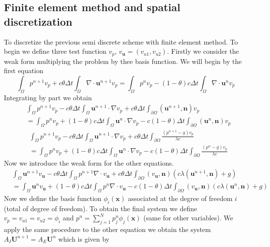 \documentclass[a4paper,twoside,french,english,11pt]{article}
\begin{document}
\subsection{Finite element method and spatial discretization}
To discretize the previous semi discrete scheme with finite element method. To begin we define three test function $v_p$, $v_{\bm{u}}=(v_{u1},v_{u2})$. Firstly we consider the weak form multiplying the problem by thee basis function. We will begin by the first equation
$$
\int_{\Omega}p^{n+1}v_p+ c\theta\Delta t  \int_{\Omega}\nabla \cdot \mathbf{u}^{n+1}v_p=  \int_{\Omega}p^n v_p- (1-\theta) c\Delta t  \int_{\Omega}\nabla \cdot \mathbf{u}^{n} v_p
$$
Integrating by part we obtain
\begin{align*}
&\int_{\Omega}p^{n+1}v_p -c\theta \Delta t  \int_{\Omega} \mathbf{u}^{n+1}\cdot \nabla v_p+ c\theta\Delta t  \int_{\partial \Omega} (\mathbf{u}^{n+1},\bm{n}) v_p\\
& =  \int_{\Omega}p^n v_p +(1-\theta) c\Delta t  \int_{\Omega}\mathbf{u}^{n} \cdot \nabla v_p -c (1-\theta)\Delta t  \int_{\partial \Omega} (\mathbf{u}^n,\bm{n}) v_p
\end{align*}
\begin{align*}
&\int_{\Omega}p^{n+1}v_p -c\theta\Delta t  \int_{\Omega} \mathbf{u}^{n+1}\cdot \nabla v_p+ c\theta\Delta t  \int_{\partial \Omega} \frac{(p^{n+1}-g) v_p}{\lambda c}\\
& =  \int_{\Omega}p^n v_p +(1-\theta) c\Delta t  \int_{\Omega}\mathbf{u}^{n} \cdot \nabla v_p -c (1-\theta)\Delta t  \int_{\partial \Omega} \frac{(p^n-g) v_p}{\lambda c}
\end{align*}
Now we introduce the weak form for the other equations.
\begin{align*}
&\int_{\Omega}\bm{u}^{n+1}v_{\bm{u}} -c\theta \Delta t \int_{\Omega} p^{n+1}\nabla \cdot v_{\bm{u}}+ c\theta\Delta t  \int_{\partial \Omega} (v_{\bm{u}},\bm{n}) (c\lambda(\bm{u}^{n+1},\bm{n}) +g)\\
& =  \int_{\Omega}\bm{u}^{n} v_{\bm{u}} +(1-\theta) c\Delta t  \int_{\Omega} p^n\nabla \cdot v_{\bm{u}} -c (1-\theta)\Delta t  \int_{\partial \Omega} (v_{\bm{u}},\bm{n}) (c\lambda(\bm{u}^{n},\bm{n}) +g)
\end{align*}
Now we define the basis function $\phi_i(\mathbf{x})$ associated at the degree of freedom $i$ (total of degree of freedom). To obtain the final system we define $v_p=v_{u1}=v_{u2}=\phi_i$ and $p^n=\sum_{j=1}^N p_j^n \phi_j(\mathbf{x})$ (same for other variables).
We apply the same procedure to the other equation we obtain the system $A_I \mathbf{U}^{n+1}=A_E\mathbf{U}^{n}$ which is given by
\end{document}
